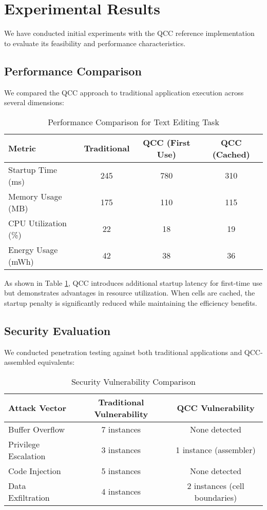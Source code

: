 \documentclass[11pt,a4paper]{article}
\begin{document}
\section{Experimental Results}

We have conducted initial experiments with the QCC reference implementation to evaluate its feasibility and performance characteristics.

\subsection{Performance Comparison}

We compared the QCC approach to traditional application execution across several dimensions:

\begin{table}[h]
\centering
\begin{tabular}{|l|c|c|c|}
\hline
\textbf{Metric} & \textbf{Traditional} & \textbf{QCC (First Use)} & \textbf{QCC (Cached)} \\
\hline
Startup Time (ms) & 245 & 780 & 310 \\
Memory Usage (MB) & 175 & 110 & 115 \\
CPU Utilization (\%) & 22 & 18 & 19 \\
Energy Usage (mWh) & 42 & 38 & 36 \\
\hline
\end{tabular}
\caption{Performance Comparison for Text Editing Task}
\label{tab:performance}
\end{table}

As shown in Table \ref{tab:performance}, QCC introduces additional startup latency for first-time use but demonstrates advantages in resource utilization. When cells are cached, the startup penalty is significantly reduced while maintaining the efficiency benefits.

\subsection{Security Evaluation}

We conducted penetration testing against both traditional applications and QCC-assembled equivalents:

\begin{table}[h]
\centering
\begin{tabular}{|l|c|c|}
\hline
\textbf{Attack Vector} & \textbf{Traditional Vulnerability} & \textbf{QCC Vulnerability} \\
\hline
Buffer Overflow & 7 instances & None detected \\
Privilege Escalation & 3 instances & 1 instance (assembler) \\
Code Injection & 5 instances & None detected \\
Data Exfiltration & 4 instances & 2 instances (cell boundaries) \\
\hline
\end{tabular}
\caption{Security Vulnerability Comparison}
\label{tab:security}
\end{table}
\end{document}
